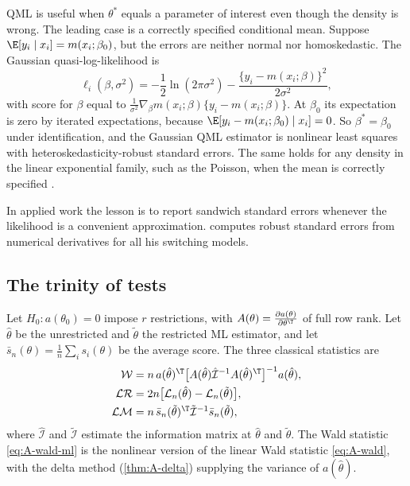 QML is useful when $\theta^*$ equals a parameter of interest even though the density is wrong. The leading case is a
correctly specified conditional mean. Suppose $\E[y_i \mid x_i] = m(x_i;\beta_0)$, but the errors are neither normal nor
homoskedastic. The Gaussian quasi-log-likelihood is
\begin{equation*}
  \ell_i(\beta, \sigma^2) = -\frac{1}{2}\ln(2\pi\sigma^2) - \frac{\{y_i - m(x_i;\beta)\}^2}{2\sigma^2},
\end{equation*}
with score for $\beta$ equal to $\frac{1}{\sigma^2}\nabla_\beta m(x_i;\beta)\{y_i - m(x_i;\beta)\}$. At $\beta_0$ its expectation
is zero by iterated expectations, because $\E[y_i - m(x_i;\beta_0) \mid x_i] = 0$. So $\beta^* = \beta_0$ under
identification, and the Gaussian QML estimator is nonlinear least squares with heteroskedasticity-robust standard errors.
The same holds for any density in the linear exponential family, such as the Poisson, when the mean is correctly
specified \citep{GourierouxMonfortTrognon1984}.

In applied work the lesson is to report sandwich standard errors whenever the likelihood is a convenient approximation.
\citet[p.~40]{Ellison1994} computes robust standard errors from numerical derivatives for all his switching models.

\subsection{The trinity of tests}\label{sec:A-mle-trinity}

Let $H_0: a(\theta_0) = 0$ impose $r$ restrictions, with $A(\theta) = \frac{\partial a(\theta)}{\partial\theta^\T}$ of full
row rank. Let $\hat\theta$ be the unrestricted and $\tilde\theta$ the restricted ML estimator, and let
$\bar s_n(\theta) = \frac{1}{n}\sum_is_i(\theta)$ be the average score. The three classical statistics are
\begin{align}
  \mathcal{W} &= n\,a(\hat\theta)^\T\big[A(\hat\theta)\hat{\mathcal{I}}^{-1}A(\hat\theta)^\T\big]^{-1}a(\hat\theta),
  \label{eq:A-wald-ml}\\
  \mathcal{LR} &= 2n\big[\mathcal{L}_n(\hat\theta) - \mathcal{L}_n(\tilde\theta)\big],\label{eq:A-lr}\\
  \mathcal{LM} &= n\,\bar s_n(\tilde\theta)^\T\tilde{\mathcal{I}}^{-1}\bar s_n(\tilde\theta),\label{eq:A-lm}
\end{align}
where $\hat{\mathcal{I}}$ and $\tilde{\mathcal{I}}$ estimate the information matrix at $\hat\theta$ and $\tilde\theta$.
The Wald statistic \eqref{eq:A-wald-ml} is the nonlinear version of the linear Wald statistic \eqref{eq:A-wald}, with the
delta method (\cref{thm:A-delta}) supplying the variance of $a(\hat\theta)$.

